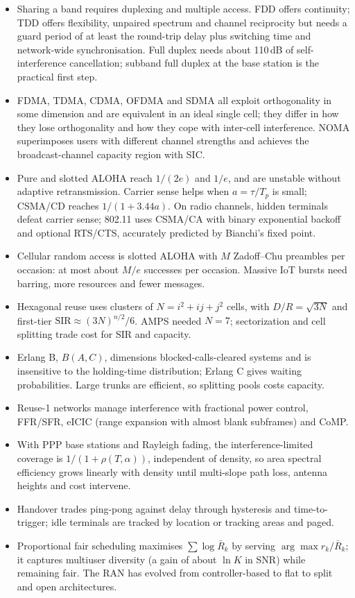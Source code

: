 \begin{itemize}
\item Sharing a band requires duplexing and multiple access. FDD offers continuity; TDD offers flexibility, unpaired
spectrum and channel reciprocity but needs a guard period of at least the round-trip delay plus switching time and
network-wide synchronisation. Full duplex needs about 110\,dB of self-interference cancellation; subband full duplex at
the base station is the practical first step.
\item FDMA, TDMA, CDMA, OFDMA and SDMA all exploit orthogonality in some dimension and are equivalent in an ideal single
cell; they differ in how they lose orthogonality and how they cope with inter-cell interference. NOMA superimposes users
with different channel strengths and achieves the broadcast-channel capacity region with SIC.
\item Pure and slotted ALOHA reach $1/(2e)$ and $1/e$, and are unstable without adaptive retransmission. Carrier sense helps
when $a=\tau/T_p$ is small; CSMA/CD reaches $1/(1+3.44a)$. On radio channels, hidden terminals defeat carrier sense;
802.11 uses CSMA/CA with binary exponential backoff and optional RTS/CTS, accurately predicted by Bianchi's fixed point.
\item Cellular random access is slotted ALOHA with $M$ Zadoff--Chu preambles per occasion: at most about $M/e$ successes per
occasion. Massive IoT bursts need barring, more resources and fewer messages.
\item Hexagonal reuse uses clusters of $N=i^2+ij+j^2$ cells, with $D/R=\sqrt{3N}$ and first-tier
$\mathrm{SIR}\approx(3N)^{n/2}/6$. AMPS needed $N=7$; sectorization and cell splitting trade cost for SIR and capacity.
\item Erlang B, $B(A,C)$, dimensions blocked-calls-cleared systems and is insensitive to the holding-time distribution;
Erlang C gives waiting probabilities. Large trunks are efficient, so splitting pools costs capacity.
\item Reuse-1 networks manage interference with fractional power control, FFR/SFR, eICIC (range expansion with almost blank
subframes) and CoMP.
\item With PPP base stations and Rayleigh fading, the interference-limited coverage is $1/(1+\rho(T,\alpha))$, independent of
density, so area spectral efficiency grows linearly with density until multi-slope path loss, antenna heights and cost
intervene.
\item Handover trades ping-pong against delay through hysteresis and time-to-trigger; idle terminals are tracked by
location or tracking areas and paged.
\item Proportional fair scheduling maximises $\sum\log\bar R_k$ by serving $\arg\max r_k/\bar R_k$; it captures multiuser
diversity (a gain of about $\ln K$ in SNR) while remaining fair. The RAN has evolved from controller-based to flat to split
and open architectures.
\end{itemize}

